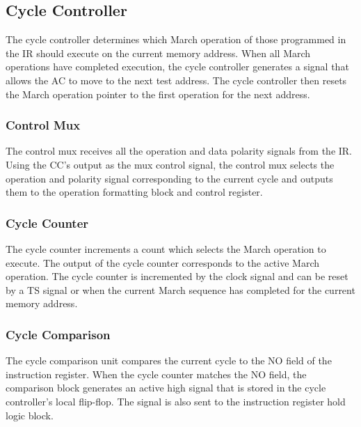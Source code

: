 \subsection{Cycle Controller}
\label{sect:bg-blocks-cycle-controller}
The cycle controller determines which March operation of those programmed in the IR should execute on the current memory address.  When all March operations have completed execution, the cycle controller generates a signal that allows the AC to move to the next test address.  The cycle controller then resets the March operation pointer to the first operation for the next address.   

\subsubsection{Control Mux}
The control mux receives all the operation and data polarity signals from the IR.  Using the CC's output as the mux control signal, the control mux selects the operation and polarity signal corresponding to the current cycle and outputs them to the operation formatting block and control register.  

\subsubsection{Cycle Counter}
The cycle counter increments a count which selects the March operation to execute.  The output of the cycle counter corresponds to the active March operation.  The cycle counter is incremented by the clock signal and can be reset by a TS signal or when the current March sequence has completed for the current memory address. 

\subsubsection{Cycle Comparison}
The cycle comparison unit compares the current cycle to the NO field of the instruction register.  When the cycle counter matches the NO field, the comparison block generates an active high signal that is stored in the cycle controller's local flip-flop.  The signal is also sent to the instruction register hold logic block.  


